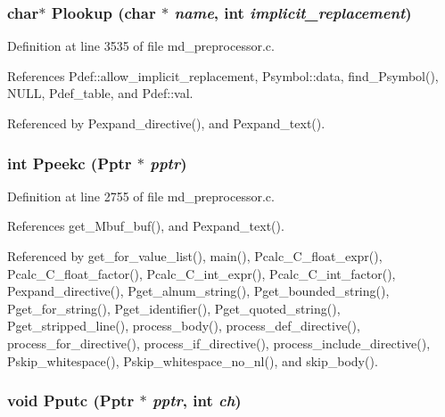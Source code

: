 \subsubsection{\setlength{\rightskip}{0pt plus 5cm}char$\ast$ Plookup (char $\ast$ {\em name}, int {\em implicit\_\-replacement})}\label{md__preprocessor_8h_8ac3ceff2e23da42c21150cfc5d3ff21}




Definition at line 3535 of file md\_\-preprocessor.c.

References Pdef::allow\_\-implicit\_\-replacement, Psymbol::data, find\_\-Psymbol(), NULL, Pdef\_\-table, and Pdef::val.

Referenced by Pexpand\_\-directive(), and Pexpand\_\-text().
\subsubsection{\setlength{\rightskip}{0pt plus 5cm}int Ppeekc (\bf{Pptr} $\ast$ {\em pptr})}\label{md__preprocessor_8h_5b05ec5cf990254459f0b332eb08b6cd}




Definition at line 2755 of file md\_\-preprocessor.c.

References get\_\-Mbuf\_\-buf(), and Pexpand\_\-text().

Referenced by get\_\-for\_\-value\_\-list(), main(), Pcalc\_\-C\_\-float\_\-expr(), Pcalc\_\-C\_\-float\_\-factor(), Pcalc\_\-C\_\-int\_\-expr(), Pcalc\_\-C\_\-int\_\-factor(), Pexpand\_\-directive(), Pget\_\-alnum\_\-string(), Pget\_\-bounded\_\-string(), Pget\_\-for\_\-string(), Pget\_\-identifier(), Pget\_\-quoted\_\-string(), Pget\_\-stripped\_\-line(), process\_\-body(), process\_\-def\_\-directive(), process\_\-for\_\-directive(), process\_\-if\_\-directive(), process\_\-include\_\-directive(), Pskip\_\-whitespace(), Pskip\_\-whitespace\_\-no\_\-nl(), and skip\_\-body().
\subsubsection{\setlength{\rightskip}{0pt plus 5cm}void Pputc (\bf{Pptr} $\ast$ {\em pptr}, int {\em ch})}\label{md__preprocessor_8h_d8d34f9d84875158116eecfd1f6a0c14}




